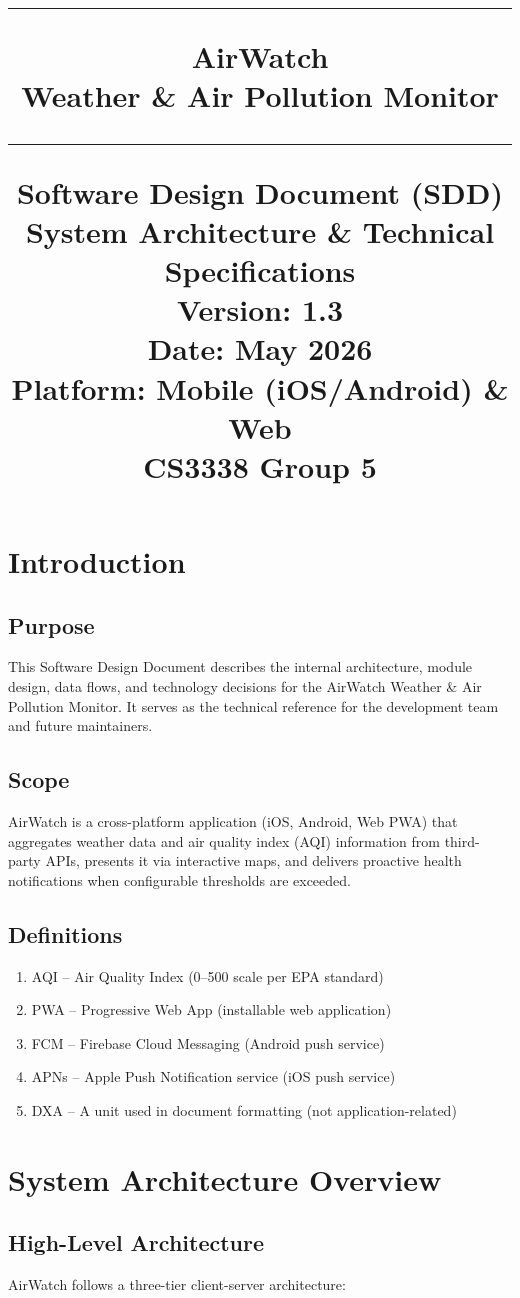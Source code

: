 \documentclass[12pt]{article}
\title{\noindent\rule{\textwidth}{0.5pt}
\huge{AirWatch} \vspace{0.1cm}\\ \large{Weather \& Air Pollution Monitor\\}
\noindent\rule{\textwidth}{0.5pt}
\Large{Software Design Document (SDD)\\\small{System Architecture \& Technical Specifications\\}}
\vspace{0.1cm}
\small{ 
Version: 1.3\\ 
Date: May 2026\\
Platform: Mobile (iOS/Android) \& Web\\
CS3338 Group  5}
}
\date{}
\begin{document}
\maketitle
\tableofcontents
\newpage

\section{Introduction}

\subsection{Purpose}
This Software Design Document describes the internal architecture, module design, data flows, and technology decisions for the AirWatch Weather \& Air Pollution Monitor. It serves as the technical reference for the development team and future maintainers.

\subsection{Scope}
AirWatch is a cross-platform application (iOS, Android, Web PWA) that aggregates weather data and air quality index (AQI) information from third-party APIs, presents it via interactive maps, and delivers proactive health notifications when configurable thresholds are exceeded.

\subsection{Definitions}
\begin{enumerate}
    \item AQI -- Air Quality Index (0--500 scale per EPA standard)
    \item PWA -- Progressive Web App (installable web application)
    \item FCM -- Firebase Cloud Messaging (Android push service)
    \item APNs -- Apple Push Notification service (iOS push service)
    \item DXA -- A unit used in document formatting (not application-related)
\end{enumerate}

\section{System Architecture Overview}

\subsection{High-Level Architecture}
AirWatch follows a three-tier client-server architecture:
\end{document}
